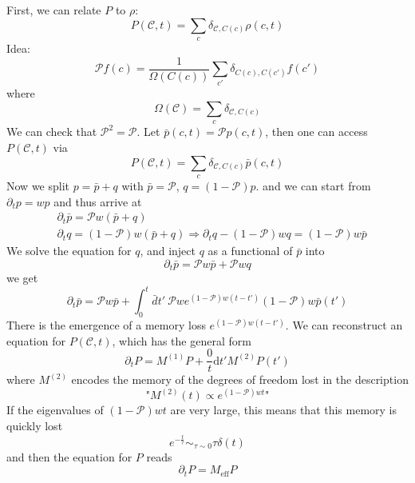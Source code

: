 \documentclass[a4paper]{book}
\theoremstyle{definition}
\theoremstyle{remark}
\begin{document}
First, we can relate $P$ to $\rho$: 
\begin{equation}
    P(\mathscr{C}, t) = \sum_c \delta_{\mathscr{C}, C(c)}\rho(c, t)
\end{equation}
Idea: 
\begin{equation}
    \mathscr{P}f(c) = \frac{1}{\Omega(C(c))}\sum_{c'}\delta_{C(c), C(c')}f(c')
\end{equation}
where 
\begin{equation}
    \Omega(\mathscr{C}) = \sum_c \delta_{\mathscr{C}, C(c)}
\end{equation}
We can check that $\mathscr{P}^2 = \mathscr{P}$. 
Let $\bar{p}(c, t) = \mathscr{P}p(c, t)$, then one can access $P(\mathscr{C}, t)$ via 
\begin{equation}
    P(\mathscr{C}, t) = \sum_c \delta_{\mathscr{C}, C(c)}\bar{p}(c, t)
\end{equation}
Now we split $p = \bar{p} + q$ with $\bar{p} = \mathscr{P}$, $q = (1-\mathscr{P})p$. and we can start from $\partial_t p = wp$ and thus arrive at 
\begin{equation}
    \begin{aligned}
        &\partial_t \bar{p} = \mathscr{P} w(\bar{p} + q) \\ 
        &\partial_t q = (1- \mathscr{P})w(\bar{p} + q) \Rightarrow \partial_t q - (1-\mathscr{P})wq = (1-\mathscr{P})w\bar{p}
    \end{aligned}
\end{equation}
We solve the equation for $q$, and inject $q$ as a functional of $\bar{p}$ into 
\begin{equation}
    \partial_t\bar{p} = \mathscr{P}w\bar{p} + \mathscr{P}wq
\end{equation}
we get 
\begin{equation}
    \partial_t \bar{p} = \mathscr{P}w\bar{p} + \int_{0}^{t} \bar{d}t' ~ \mathscr{P}we^{(1-\mathscr{P})w(t-t')}(1-\mathscr{P})w\bar{p}(t')
\end{equation}
There is the emergence of a memory loss $e^{(1-\mathscr{P})w(t-t')}$. We can reconstruct an equation for $P(\mathscr{C}, t)$, which has the general form 
\begin{equation}
    \partial_t P = M^{(1)}P + \frac{0}{t}\text{d}t' M^{(2)}P(t')
\end{equation}
where $M^{(2)}$ encodes the memory of the degrees of freedom lost in the description 
\begin{equation}
    \text{"}M^{(2)}(t) \propto e^{(1-\mathscr{P})wt} \text{"}
\end{equation}
If the eigenvalues of $(1-\mathscr{P})wt$ are very large, this means that this memory is quickly lost 
\begin{equation}
    e^{-\frac{t}{\tau}} \sim_{\tau \sim 0} \tau \delta(t)
\end{equation}
and then the equation for $P$ reads 
\begin{equation}
    \partial_t P = M_{\text{eff}}P
\end{equation}
\end{document}
